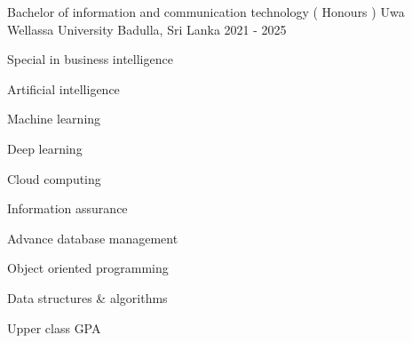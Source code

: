 

\begin{cventries}

  \cventry
    {Bachelor of information and communication technology ( Honours )} %
    {Uwa Wellassa University} %
    {Badulla, Sri Lanka} %
    {2021 - 2025} %
    {
      \begin{cvitems} %
        \item {Special in business intelligence }
        \item {Artificial intelligence}
        \item {Machine learning}
        \item {Deep learning}
        \item {Cloud computing}
        \item {Information assurance }
        \item {Advance database management}
        \item {Object oriented programming}
        \item {Data structures  &  algorithms}
        \item {Upper class GPA}
      \end{cvitems}
    }

\end{cventries}
